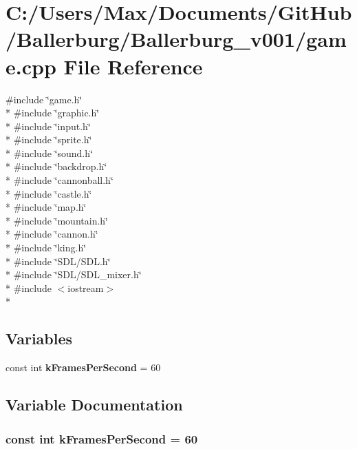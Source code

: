 \section{C\+:/\+Users/\+Max/\+Documents/\+Git\+Hub/\+Ballerburg/\+Ballerburg\+\_\+v001/game.cpp File Reference}
\label{game_8cpp}
{\ttfamily \#include \char`\"{}game.\+h\char`\"{}}\\*
{\ttfamily \#include \char`\"{}graphic.\+h\char`\"{}}\\*
{\ttfamily \#include \char`\"{}input.\+h\char`\"{}}\\*
{\ttfamily \#include \char`\"{}sprite.\+h\char`\"{}}\\*
{\ttfamily \#include \char`\"{}sound.\+h\char`\"{}}\\*
{\ttfamily \#include \char`\"{}backdrop.\+h\char`\"{}}\\*
{\ttfamily \#include \char`\"{}cannonball.\+h\char`\"{}}\\*
{\ttfamily \#include \char`\"{}castle.\+h\char`\"{}}\\*
{\ttfamily \#include \char`\"{}map.\+h\char`\"{}}\\*
{\ttfamily \#include \char`\"{}mountain.\+h\char`\"{}}\\*
{\ttfamily \#include \char`\"{}cannon.\+h\char`\"{}}\\*
{\ttfamily \#include \char`\"{}king.\+h\char`\"{}}\\*
{\ttfamily \#include \char`\"{}S\+D\+L/\+S\+D\+L.\+h\char`\"{}}\\*
{\ttfamily \#include \char`\"{}S\+D\+L/\+S\+D\+L\+\_\+mixer.\+h\char`\"{}}\\*
{\ttfamily \#include $<$iostream$>$}\\*
\subsection*{Variables}
\begin{DoxyCompactItemize}
\item 
const int {\bf k\+Frames\+Per\+Second} = 60
\end{DoxyCompactItemize}


\subsection{Variable Documentation}
\subsubsection[{k\+Frames\+Per\+Second}]{\setlength{\rightskip}{0pt plus 5cm}const int k\+Frames\+Per\+Second = 60}\label{game_8cpp_a1cb288334342056020b81f3bcdc2659e}
